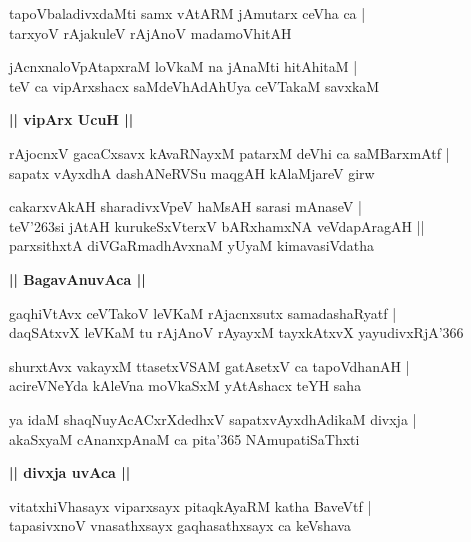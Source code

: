 \documentclass[twoside,12pt,openright]{book}
\def\S{\char'263}
\newcounter{shloka}[chapter]
\def\uvaca#1{\centerline{{\large\textbf{#1}}}}
\begin{document}
\begin{shloka}%
tapoVbaladivxdaMti samx vAtARM jAmutarx ceVha ca |\\
tarxyoV rAjakuleV rAjAnoV madamoVhitAH 
\end{shloka}

\begin{shloka}%
jAcnxnaloVpAtapxraM loVkaM na jAnaMti hitAhitaM |\\
teV ca vipArxshacx saMdeVhAdAhUya ceVTakaM savxkaM 
\end{shloka}

\uvaca{|| vipArx UcuH ||}

\begin{shloka}%
rAjocnxV gacaCxsavx kAvaRNayxM patarxM deVhi ca saMBarxmAtf |\\
sapatx vAyxdhA dashANeRVSu maqgAH kAlaMjareV girw
\end{shloka}

\begin{shloka}%
cakarxvAkAH sharadivxVpeV haMsAH sarasi mAnaseV |\\
teV\S si jAtAH kurukeSxVterxV bARxhamxNA veVdapAragAH ||\\
parxsithxtA diVGaRmadhAvxnaM yUyaM kimavasiVdatha
\end{shloka}

\uvaca{|| BagavAnuvAca ||}

\begin{shloka}%
gaqhiVtAvx ceVTakoV leVKaM rAjacnxsutx samadashaRyatf |\\
daqSAtxvX leVKaM tu rAjAnoV rAyayxM tayxkAtxvX yayudivxRjA\char'366 
\end{shloka}

\begin{shloka}%
shurxtAvx vakayxM ttasetxVSAM gatAsetxV ca tapoVdhanAH |\\
acireVNeYda kAleVna moVkaSxM yAtAshacx teYH saha 
\end{shloka}

\begin{shloka}%
ya idaM shaqNuyAcACxrXdedhxV sapatxvAyxdhAdikaM divxja |\\
akaSxyaM cAnanxpAnaM ca pita\char'365 NAmupatiSaThxti 
\end{shloka}

\uvaca{|| divxja uvAca ||}

\begin{shloka}%
vitatxhiVhasayx viparxsayx pitaqkAyaRM katha BaveVtf |\\
tapasivxnoV vnasathxsayx gaqhasathxsayx ca keVshava
\end{shloka}
\end{document}
